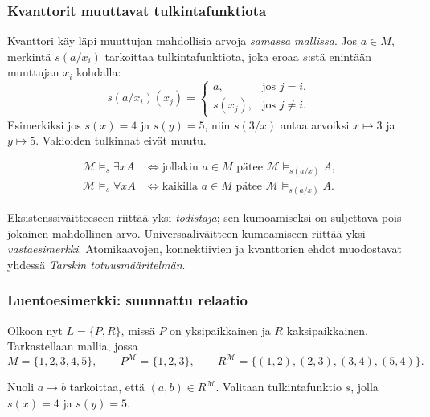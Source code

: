 \documentclass[11pt,a4paper]{amsart}
\begin{document}
\clearpage
\subsubsection{Kvanttorit muuttavat tulkintafunktiota}

Kvanttori käy läpi muuttujan mahdollisia arvoja \emph{samassa mallissa}.
Jos $a\in M$, merkintä $s(a/x_i)$ tarkoittaa tulkintafunktiota, joka
eroaa $s$:stä enintään muuttujan $x_i$ kohdalla:
\[
  s(a/x_i)(x_j)=
  \begin{cases}
    a,&\text{jos }j=i,\\
    s(x_j),&\text{jos }j\ne i.
  \end{cases}
\]
Esimerkiksi jos $s(x)=4$ ja $s(y)=5$, niin $s(3/x)$ antaa arvoiksi
$x\mapsto3$ ja $y\mapsto5$. Vakioiden tulkinnat eivät muutu.

\begin{definition}
  \begin{align*}
    \mathcal M\models_s\exists x A
    &\iff \text{jollakin }a\in M\text{ pätee }
    \mathcal M\models_{s(a/x)}A,\\
    \mathcal M\models_s\forall x A
    &\iff \text{kaikilla }a\in M\text{ pätee }
    \mathcal M\models_{s(a/x)}A.
  \end{align*}
\end{definition}

Eksistenssiväitteeseen riittää yksi \emph{todistaja}; sen kumoamiseksi
on suljettava pois jokainen mahdollinen arvo. Universaaliväitteen
kumoamiseen riittää yksi \emph{vastaesimerkki}. Atomikaavojen,
konnektiivien ja kvanttorien ehdot muodostavat yhdessä
\emph{Tarskin totuusmääritelmän}.

\subsubsection{Luentoesimerkki: suunnattu relaatio}

Olkoon nyt $L=\{P,R\}$, missä $P$ on yksipaikkainen ja $R$
kaksipaikkainen. Tarkastellaan mallia, jossa
\[
  M=\{1,2,3,4,5\},\qquad P^{\mathcal M}=\{1,2,3\},\qquad
  R^{\mathcal M}=\{(1,2),(2,3),(3,4),(5,4)\}.
\]
\begin{center}
\end{center}
Nuoli $a\to b$ tarkoittaa, että $(a,b)\in R^{\mathcal M}$.
Valitaan tulkintafunktio $s$, jolla $s(x)=4$ ja $s(y)=5$.
\end{document}
